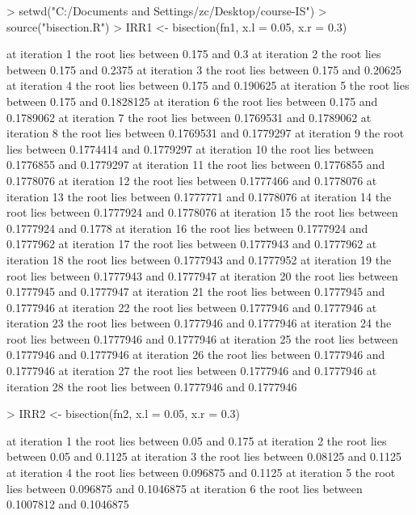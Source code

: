 \documentclass[a4paper,12pt]{article}
\begin{document}
\begin{Schunk}
\begin{Sinput}
> setwd("C:/Documents and Settings/zc/Desktop/course-IS")
> source("bisection.R")
> IRR1 <- bisection(fn1, x.l = 0.05, x.r = 0.3)
\end{Sinput}
\begin{Soutput}
at iteration 1 the root lies between 0.175 and 0.3
at iteration 2 the root lies between 0.175 and 0.2375
at iteration 3 the root lies between 0.175 and 0.20625
at iteration 4 the root lies between 0.175 and 0.190625
at iteration 5 the root lies between 0.175 and 0.1828125
at iteration 6 the root lies between 0.175 and 0.1789062
at iteration 7 the root lies between 0.1769531 and 0.1789062
at iteration 8 the root lies between 0.1769531 and 0.1779297
at iteration 9 the root lies between 0.1774414 and 0.1779297
at iteration 10 the root lies between 0.1776855 and 0.1779297
at iteration 11 the root lies between 0.1776855 and 0.1778076
at iteration 12 the root lies between 0.1777466 and 0.1778076
at iteration 13 the root lies between 0.1777771 and 0.1778076
at iteration 14 the root lies between 0.1777924 and 0.1778076
at iteration 15 the root lies between 0.1777924 and 0.1778
at iteration 16 the root lies between 0.1777924 and 0.1777962
at iteration 17 the root lies between 0.1777943 and 0.1777962
at iteration 18 the root lies between 0.1777943 and 0.1777952
at iteration 19 the root lies between 0.1777943 and 0.1777947
at iteration 20 the root lies between 0.1777945 and 0.1777947
at iteration 21 the root lies between 0.1777945 and 0.1777946
at iteration 22 the root lies between 0.1777946 and 0.1777946
at iteration 23 the root lies between 0.1777946 and 0.1777946
at iteration 24 the root lies between 0.1777946 and 0.1777946
at iteration 25 the root lies between 0.1777946 and 0.1777946
at iteration 26 the root lies between 0.1777946 and 0.1777946
at iteration 27 the root lies between 0.1777946 and 0.1777946
at iteration 28 the root lies between 0.1777946 and 0.1777946
\end{Soutput}
\begin{Sinput}
> IRR2 <- bisection(fn2, x.l = 0.05, x.r = 0.3)
\end{Sinput}
\begin{Soutput}
at iteration 1 the root lies between 0.05 and 0.175
at iteration 2 the root lies between 0.05 and 0.1125
at iteration 3 the root lies between 0.08125 and 0.1125
at iteration 4 the root lies between 0.096875 and 0.1125
at iteration 5 the root lies between 0.096875 and 0.1046875
at iteration 6 the root lies between 0.1007812 and 0.1046875

\end{Soutput}
\end{Schunk}
\end{document}
